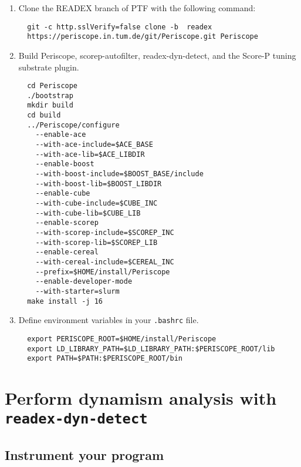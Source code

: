 \documentclass[12pt]{article}
\begin{document}
\begin{enumerate}
\item Clone the READEX branch of PTF with the following command:

\begin{verbatim}
  git -c http.sslVerify=false clone -b  readex
  https://periscope.in.tum.de/git/Periscope.git Periscope
\end{verbatim}

\item Build Periscope, scorep-autofilter, readex-dyn-detect, and the Score-P tuning substrate plugin.

\begin{verbatim}
  cd Periscope
  ./bootstrap
  mkdir build
  cd build
  ../Periscope/configure
    --enable-ace 
    --with-ace-include=$ACE_BASE
    --with-ace-lib=$ACE_LIBDIR
    --enable-boost
    --with-boost-include=$BOOST_BASE/include
    --with-boost-lib=$BOOST_LIBDIR
    --enable-cube 
    --with-cube-include=$CUBE_INC 
    --with-cube-lib=$CUBE_LIB
    --enable-scorep
    --with-scorep-include=$SCOREP_INC
    --with-scorep-lib=$SCOREP_LIB
    --enable-cereal
    --with-cereal-include=$CEREAL_INC
    --prefix=$HOME/install/Periscope
    --enable-developer-mode
    --with-starter=slurm
  make install -j 16
\end{verbatim}

\item Define environment variables in your {\tt .bashrc} file.

  \begin{verbatim}
  export PERISCOPE_ROOT=$HOME/install/Periscope
  export LD_LIBRARY_PATH=$LD_LIBRARY_PATH:$PERISCOPE_ROOT/lib
  export PATH=$PATH:$PERISCOPE_ROOT/bin
  \end{verbatim}

\end{enumerate}


\newpage
\section{Perform dynamism analysis with {\tt readex-dyn-detect}}

\subsection{Instrument your program}
\end{document}
